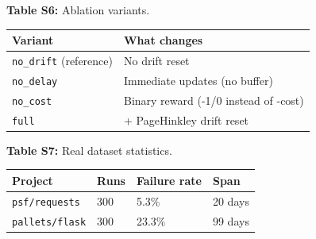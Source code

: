 \documentclass[10pt]{article}
\begin{document}
\noindent\textbf{Table S6:} Ablation variants.

\begin{table}[t]\centering\footnotesize\begin{tabular}{ll}
\toprule\noalign{}
Variant & What changes \\
\midrule\noalign{}
\bottomrule\noalign{}
\texttt{no\_drift} (reference) & No drift reset \\
\texttt{no\_delay} & Immediate updates (no buffer) \\
\texttt{no\_cost} & Binary reward (-1/0 instead of -cost) \\
\texttt{full} & + PageHinkley drift reset \\
\end{tabular}\end{table}

\noindent\textbf{Table S7:} Real dataset statistics.

\begin{table}[t]\centering\footnotesize\begin{tabular}{llll}
\toprule\noalign{}
Project & Runs & Failure rate & Span \\
\midrule\noalign{}
\bottomrule\noalign{}
\texttt{psf/requests} & 300 & 5.3\% & 20 days \\
\texttt{pallets/flask} & 300 & 23.3\% & 99 days \\
\end{tabular}\end{table}
\end{document}
